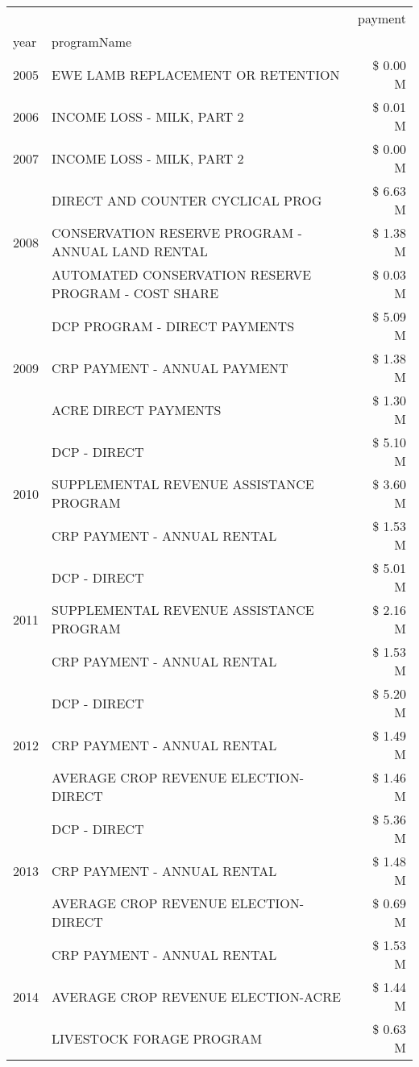 \begin{tabular}{llr}
\toprule
 &  & payment \\
year & programName &  \\
\midrule
2005 & EWE LAMB REPLACEMENT OR RETENTION & \$ 0.00 M \\
\cline{1-3}
2006 & INCOME LOSS - MILK, PART 2 & \$ 0.01 M \\
\cline{1-3}
2007 & INCOME LOSS - MILK, PART 2 & \$ 0.00 M \\
\cline{1-3}
\multirow[t]{3}{*}{2008} & DIRECT AND COUNTER CYCLICAL PROG & \$ 6.63 M \\
 & CONSERVATION RESERVE PROGRAM - ANNUAL LAND RENTAL & \$ 1.38 M \\
 & AUTOMATED CONSERVATION RESERVE PROGRAM - COST SHARE & \$ 0.03 M \\
\cline{1-3}
\multirow[t]{3}{*}{2009} & DCP PROGRAM - DIRECT PAYMENTS & \$ 5.09 M \\
 & CRP PAYMENT - ANNUAL PAYMENT & \$ 1.38 M \\
 & ACRE DIRECT PAYMENTS & \$ 1.30 M \\
\cline{1-3}
\multirow[t]{3}{*}{2010} & DCP - DIRECT & \$ 5.10 M \\
 & SUPPLEMENTAL REVENUE ASSISTANCE PROGRAM & \$ 3.60 M \\
 & CRP PAYMENT - ANNUAL RENTAL & \$ 1.53 M \\
\cline{1-3}
\multirow[t]{3}{*}{2011} & DCP - DIRECT & \$ 5.01 M \\
 & SUPPLEMENTAL REVENUE ASSISTANCE PROGRAM & \$ 2.16 M \\
 & CRP PAYMENT - ANNUAL RENTAL & \$ 1.53 M \\
\cline{1-3}
\multirow[t]{3}{*}{2012} & DCP - DIRECT & \$ 5.20 M \\
 & CRP PAYMENT - ANNUAL RENTAL & \$ 1.49 M \\
 & AVERAGE CROP REVENUE ELECTION-DIRECT & \$ 1.46 M \\
\cline{1-3}
\multirow[t]{3}{*}{2013} & DCP - DIRECT & \$ 5.36 M \\
 & CRP PAYMENT - ANNUAL RENTAL & \$ 1.48 M \\
 & AVERAGE CROP REVENUE ELECTION-DIRECT & \$ 0.69 M \\
\cline{1-3}
\multirow[t]{3}{*}{2014} & CRP PAYMENT - ANNUAL RENTAL & \$ 1.53 M \\
 & AVERAGE CROP REVENUE ELECTION-ACRE & \$ 1.44 M \\
 & LIVESTOCK FORAGE PROGRAM & \$ 0.63 M \\
\cline{1-3}

\end{tabular}
